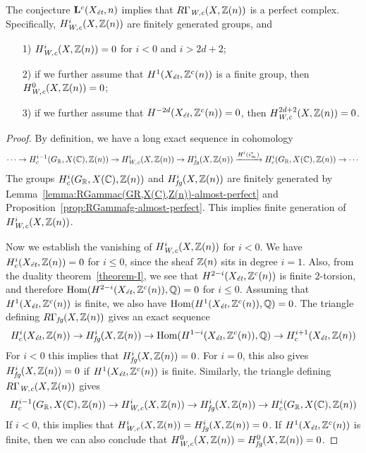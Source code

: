 \documentclass{article}
\numberwithin{equation}{section}
\begin{document}
\begin{proposition}
  \label{prop:RGammaWc-perfect}
  The conjecture $\mathbf{L}^c (X_\et,n)$ implies that $R\Gamma_\Wc (X, \ZZ(n))$
  is a perfect complex. Specifically, $H^i_\Wc (X, \ZZ(n))$ are finitely
  generated groups, and
  \begin{enumerate}
  \item[1)] $H^i_\Wc (X,\ZZ(n)) = 0$ for $i < 0$ and $i > 2d+2$;

  \item[2)] if we further assume that $H^1 (X_\et, \ZZ^c(n))$ is a finite group,
    then $H^0_\Wc (X,\ZZ(n)) = 0$;

  \item[3)] if we further assume that $H^{-2d} (X_\et, \ZZ^c(n)) = 0$, then
    $H^{2d+2}_\Wc (X,\ZZ(n)) = 0$.
  \end{enumerate}

  \begin{proof}
    By definition, we have a long exact sequence in cohomology
    \[ \cdots \to H^{i-1}_c (G_\RR, X (\CC), \ZZ (n)) \to
      H^i_\Wc (X,\ZZ(n)) \to
      H^i_\fg (X,\ZZ(n)) \xrightarrow{H^i (i_\infty^*)}
      H^i_c (G_\RR, X (\CC), \ZZ (n)) \to \cdots \]
    The groups $H^i_c (G_\RR, X (\CC), \ZZ (n))$ and $H^i_\fg (X, \ZZ(n))$ are
    finitely generated by Lemma~\ref{lemma:RGammac(GR,X(C),Z(n))-almost-perfect}
    and Proposition~\ref{prop:RGammafg-almost-perfect}. This implies finite
    generation of $H^i_\Wc (X, \ZZ(n))$.

    \vspace{1em}

    Now we establish the vanishing of $H^i_\Wc (X, \ZZ(n))$ for $i < 0$.
    We have $H^i_c (X_\et, \ZZ(n)) = 0$ for $i \le 0$, since the sheaf $\ZZ(n)$
    sits in degree $i = 1$. Also, from the duality theorem~\ref{theorem-I}, we
    see that $H^{2-i} (X_\et, \ZZ^c (n))$ is finite $2$-torsion, and therefore
    $\Hom (H^{2-i} (X_\et, \ZZ^c (n)), \QQ) = 0$ for $i \le 0$. Assuming that
    $H^1 (X_\et, \ZZ^c (n))$ is finite, we also have
    $\Hom (H^1 (X_\et, \ZZ^c (n)), \QQ) = 0$. The triangle defining
    $R\Gamma_\fg (X, \ZZ(n))$ gives an exact sequence
    \[ H^i_c (X_\et, \ZZ(n)) \to
      H^i_\fg (X, \ZZ(n)) \to
      \Hom (H^{1-i} (X_\et, \ZZ^c (n)), \QQ) \to
      H^{i+1}_c (X_\et, \ZZ(n)) \]
    For $i < 0$ this implies that $H^i_\fg (X, \ZZ(n)) = 0$.
    For $i = 0$, this also gives $H^i_\fg (X, \ZZ(n)) = 0$
    if $H^1 (X_\et, \ZZ^c (n))$ is finite.
    Similarly, the triangle defining $R\Gamma_\Wc (X, \ZZ(n))$ gives
    \[ H^{i-1}_c (G_\RR, X (\CC), \ZZ (n)) \to
      H^i_\Wc (X, \ZZ(n)) \to
      H^i_\fg (X, \ZZ(n)) \to
      H^i_c (G_\RR, X (\CC), \ZZ (n)) \]
    If $i < 0$, this implies that
    $H^i_\Wc (X, \ZZ(n)) = H^i_\fg (X, \ZZ(n)) = 0$.
    If $H^1 (X_\et, \ZZ^c (n))$ is finite, then we can also conclude that
    $H^0_\Wc (X, \ZZ(n)) = H^0_\fg (X, \ZZ(n)) = 0$.


\end{proof}
\end{proposition}
\end{document}
